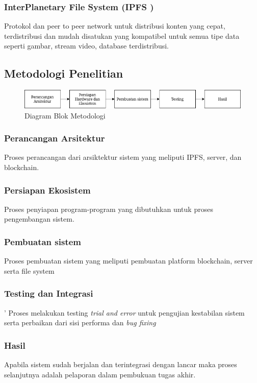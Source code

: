 \subsubsection{InterPlanetary File System (IPFS )}
Protokol dan peer to
peer network untuk distribusi konten yang cepat, terdistribusi
dan mudah disatukan yang kompatibel untuk semua tipe data
seperti gambar, stream video, database terdistribusi.

\subsection{Metodologi Penelitian}

\begin{figure} [ht] \centering
  \includegraphics[scale=0.55]{gambar/diagram_blok_metodologi.png}
  \caption{Diagram Blok Metodologi}
  \label{fig:Blueprint}
\end{figure}

\subsubsection{Perancangan Arsitektur}
Proses perancangan dari arsiktektur sistem yang meliputi IPFS, server, dan blockchain.

\subsubsection{Persiapan Ekosistem}
Proses penyiapan program-program yang dibutuhkan untuk proses pengembangan sistem.

\subsubsection{Pembuatan sistem}
Proses pembuatan sistem yang meliputi pembuatan platform blockchain, server serta file system

\subsubsection{Testing dan Integrasi}'
Proses melakukan testing \emph{trial and error} untuk pengujian kestabilan sistem serta perbaikan dari sisi performa dan \emph{bug fixing}

\subsubsection{Hasil}
Apabila sistem sudah berjalan dan terintegrasi dengan lancar maka proses selanjutnya adalah pelaporan dalam pembukuan tugas akhir.
